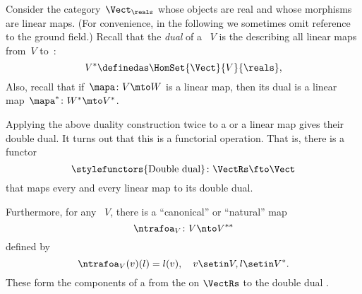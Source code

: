\begin{example}
    \label{ex:Vect}
    Consider the category~$\Vect_{\reals}$ whose objects are real  and whose morphisms are linear maps.
    (For convenience, in the following we sometimes omit reference to the ground field.)
    Recall that the \emph{dual} of a ~$V$ is the  describing all linear maps from~$V$ to~\reals:
    \begin{equation}
        \label{eq:dual-vector-space}
        V^* \definedas \HomSet{\Vect}{V}{\reals},
    \end{equation}
    Also, recall that if~$\mapa\colon V \mto W$ is a linear map, then its dual is a linear map~$\mapa^* \linebreak[1]  \colon W^* \mto V^*$.

    Applying the above duality construction twice to a  or a linear map gives their double dual.
    It turns out that this is a functorial operation.
    That is, there is a functor
    \begin{equation}
        \label{eq:double-dual-functor}
        \text{\stylefunctors{Double dual}}\colon \VectRs \fto \Vect
    \end{equation}
    that maps every  and every linear map to its double dual.

    Furthermore, for any ~$V$, there is a ``canonical'' or ``natural'' map
    \begin{equation}
        \ntrafoa_V \colon V \nto V^{**}
    \end{equation}
    defined by
    \begin{equation}
        \label{eq:natural-trafo-to-double-dual}
        \ntrafoa_V(v)(l) = l(v), \quad  v \setin V, l \setin V^*.
    \end{equation}
    These form the components of a  from the  on $\VectRs$ to the double dual .

\end{example}

